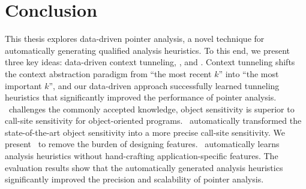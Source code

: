 \chapter{Conclusion}\label{sec:Conclusion}
This thesis explores data-driven pointer analysis, a novel technique for automatically generating qualified analysis heuristics. 
To this end, we present three key ideas: data-driven context tunneling, \ourtechnique, and \Graphick. Context tunneling shifts the context abstraction paradigm from ``the most recent $k$'' into ``the most important $k$'', and our data-driven approach successfully learned tunneling heuristics that significantly improved the performance of pointer analysis.
\ourtechnique~challenges the commonly accepted knowledge, object sensitivity is superior to call-site sensitivity for object-oriented programs. \ourtechnique~automatically transformed the state-of-the-art object sensitivity into a more precise call-site sensitivity. 
We present \Graphick~to remove the burden of designing features. \Graphick~automatically learns analysis heuristics without hand-crafting application-specific features. The evaluation results show that the automatically generated analysis heuristics significantly improved the precision and scalability of pointer analysis. 












